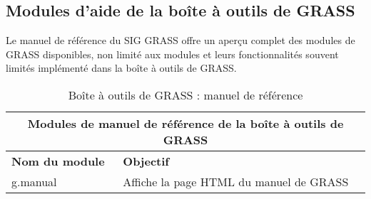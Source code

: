 \subsection{Modules d'aide de la boîte à outils de GRASS}

Le manuel de référence du SIG GRASS offre un aper\c{c}u complet des modules de GRASS disponibles, non limité aux modules et leurs fonctionnalités souvent limités implémenté dans la boîte à outils de GRASS.

\begin{table}[H]
\centering
 \begin{tabular}{|p{4cm}|p{10cm}|}
  \hline \multicolumn{2}{|c|}{\textbf{Modules de manuel de référence de la boîte à outils de GRASS}} \\
  \hline \textbf{Nom du module} & \textbf{Objectif} \\
  \hline g.manual & Affiche la page HTML du manuel de GRASS \\
\hline
\end{tabular}
\caption{Boîte à outils de GRASS : manuel de référence}
\end{table}
